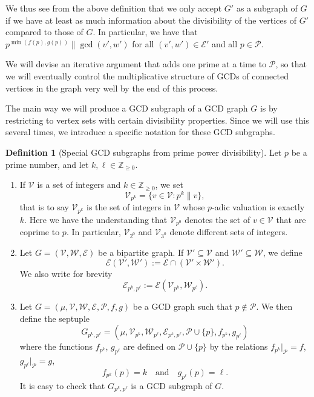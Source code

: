 \documentclass[12pt]{amsart}
\numberwithin{equation}{section}
\theoremstyle{definition}
\newtheorem{dfn}[lem]{Definition}
\theoremstyle{remark}
\newcommand{\Z}{\mathbb{Z}}
\newcommand{\CE}{\mathcal{E}}
\newcommand{\CP}{\mathcal{P}}
\newcommand{\CV}{\mathcal{V}}
\newcommand{\CW}{\mathcal{W}}
\renewcommand{\ge}{\geqslant}
\begin{document}
We thus see from the above definition that we only accept $G'$ as a subgraph of $G$ if we have at least as much information about the divisibility of the vertices of $G'$ compared to those of $G$. In particular, we have that $p^{\min(f(p),g(p))} \| \gcd(v',w')$ for all $(v',w')\in\CE'$ and all $p\in\CP$.

We will devise an iterative argument that adds one prime at a time to $\CP$, so that we will eventually control the multiplicative structure of GCDs of connected vertices in the graph very well by the end of this process.

The main way we will produce a GCD subgraph of a GCD graph $G$ is by restricting to vertex sets with certain divisibility properties. Since we will use this several times, we introduce a specific notation for these GCD subgraphs.

\begin{dfn}[Special GCD subgraphs from prime power divisibility] 
\label{def:special graphs}	
Let $p$ be a prime number, and let $k,\ell\in\Z_{\ge0}$.
\begin{enumerate}
\item If $\CV$ is a set of integers and $k\in\Z_{\ge0}$, we set
	\[
	\CV_{p^k}=\{v\in\CV:p^k\|v\},
	\]
that is to say $\CV_{p^k}$ is the set of integers in $\CV$ whose $p$-adic valuation is exactly $k$. Here we have the understanding that $\CV_{p^0}$ denotes the set of $v\in\CV$ that are coprime to $p$. In particular, $\CV_{2^0}$ and $\CV_{3^0}$ denote different sets of integers. 
\item Let $G=(\CV,\CW,\CE)$ be a bipartite graph. If $\CV'\subseteq\CV$ and $\CW'\subseteq\CW$, we define
\[
\CE(\CV',\CW'):=\CE\cap(\CV'\times\CW').
\]
We also write for brevity
\[
\CE_{p^k,p^\ell}:=\CE(\CV_{p^k},\CW_{p^\ell}) .
\]
\item Let $G=(\mu,\CV,\CW,\CE,\CP,f,g)$ be a GCD graph such that $p\notin \CP$. We then define the septuple
\[
G_{p^k,p^\ell}=(\mu,\CV_{p^k},\CW_{p^\ell},\CE_{p^k,p^\ell},\CP\cup\{p\},f_{p^k},g_{p^\ell})
\]
where the functions $f_{p^k}$, $g_{p^\ell}$ are defined on $\CP\cup\{p\}$ by the relations $f_{p^k}\vert_\CP=f$, $g_{p^\ell}\vert_\CP=g$, 
\[
f_{p^k}(p)=k\quad\text{and}\quad g_{p^\ell}(p)=\ell.
\]
It is easy to check that $G_{p^k,p^\ell}$ is a GCD subgraph of $G$.
\end{enumerate}
\end{dfn}
\end{document}
